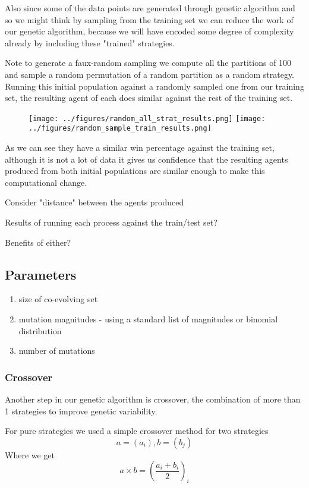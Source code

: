 \documentclass[12pt,letter]{article}
\begin{document}
Also since some of the data points are generated through genetic algorithm and so we might think by sampling from the training set we can reduce the work of our genetic algorithm, because we will have encoded some degree of complexity already by including these "trained" strategies.

Note to generate a faux-random sampling we compute all the partitions of 100 and sample a random permutation of a random partition as a random strategy. Running this initial population against a randomly sampled one from our training set, the resulting agent of each does similar against the rest of the training set.

\begin{figure}[h!]
\texttt{[image: ../figures/random\_all\_strat\_results.png]}
\texttt{[image: ../figures/random\_sample\_train\_results.png]}
\centering
\end{figure}
As we can see they have a similar win percentage against the training set, although it is not a lot of data it gives us confidence that the resulting agents produced from both initial populations are similar enough to make this computational change.

Consider "distance" between the agents produced

Results of running each process against the train/test set?

Benefits of either?
\subsection{Parameters}
\begin{enumerate}
	\item size of co-evolving set
	\item mutation magnitudes - using a standard list of magnitudes or binomial distribution
	\item number of mutations
\end{enumerate}

\subsubsection{Crossover}
Another step in our genetic algorithm is crossover, the combination of more than 1 strategies to improve genetic variability.

For pure strategies we used a simple crossover method for two strategies
\[a = (a_i), b = (b_j)\]
Where we get
\[a \times b = \left(\frac{a_i + b_i}{2}\right)_i\]
\end{document}

